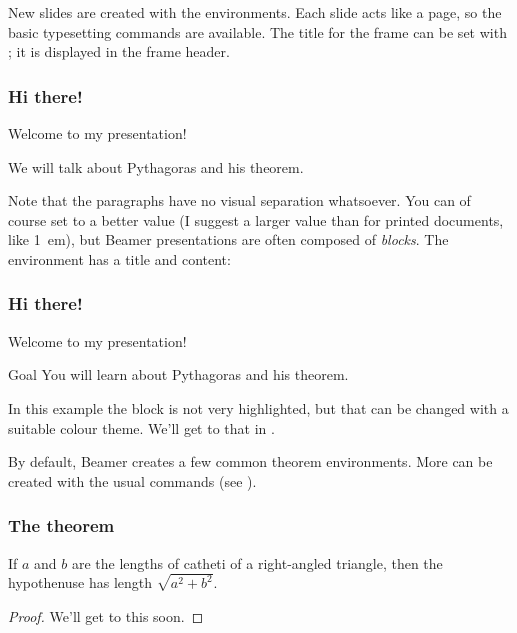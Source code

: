 New slides are created with the  environments.
Each slide acts like a page, so the basic typesetting commands are available.
The title for the frame can be set with ;
it is displayed in the frame header.
%
\begin{ExampleCode}
\begin{frame}
\frametitle{Hi there!}

Welcome to my presentation!

We will talk about Pythagoras and his theorem.
\end{frame}
\end{ExampleCode}
%

Note that the paragraphs have no visual separation whatsoever.
You can of course set  to a better value
(I suggest a larger value than for printed documents, like 1~em),
but Beamer presentations are often composed of \emph{blocks}.
The  environment has a title and content:
%
\begin{ExampleCode}
\begin{frame}
\frametitle{Hi there!}

Welcome to my presentation!

\begin{block}{Goal}
You will learn about Pythagoras and his theorem.
\end{block}
\end{frame}
\end{ExampleCode}
%
%
In this example the block is not very highlighted,
but that can be changed with a suitable colour theme.
We'll get to that in .

By default, Beamer creates a few common theorem environments.
More can be created with the usual  commands (see ).
%
\begin{ExampleCode}
\begin{frame}
\frametitle{The theorem}

\begin{theorem}
If $a$ and $b$ are the lengths of catheti of a right-angled triangle,
then the hypothenuse has length $\sqrt{a^2 + b^2}$.
\end{theorem}
\begin{proof}
We'll get to this soon.
\end{proof}

\end{frame}
\end{ExampleCode}
%


